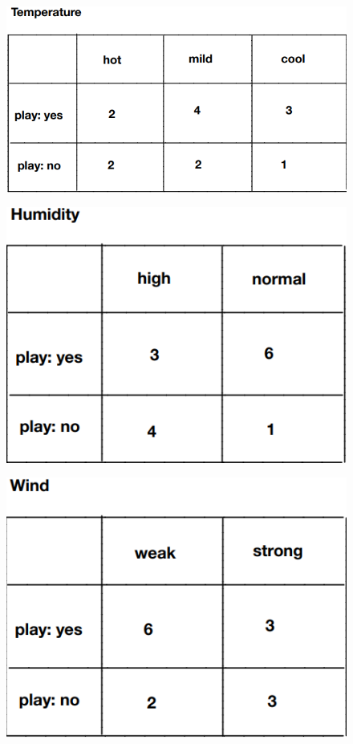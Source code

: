 \documentclass[11pt]{article}
\makeatletter
\def\maxwidth{\ifdim\Gin@nat@width>\linewidth\linewidth
    \else\Gin@nat@width\fi}
\let\Oldincludegraphics\includegraphics
\renewcommand{\includegraphics}[1]{\Oldincludegraphics[width=.8\maxwidth]{#1}}
\makeatother
\begin{document}
\begin{figure}[H]
\centering
\includegraphics{4.png}
\caption{}
\end{figure}

\begin{figure}[H]
\centering
\includegraphics{5.png}
\caption{}
\end{figure}

\begin{figure}[H]
\centering
\includegraphics{6.png}
\caption{}
\end{figure}
\end{document}
